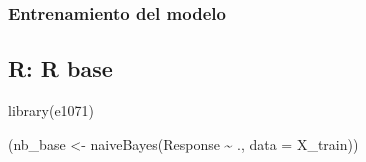 \documentclass[
  letterpaper,
  DIV=11,
  numbers=noendperiod]{scrartcl}
\newenvironment{Shaded}{\begin{snugshade}}{\end{snugshade}}
\newcommand{\AttributeTok}[1]{\textcolor[rgb]{0.40,0.45,0.13}{#1}}
\newcommand{\FunctionTok}[1]{\textcolor[rgb]{0.28,0.35,0.67}{#1}}
\newcommand{\NormalTok}[1]{\textcolor[rgb]{0.00,0.23,0.31}{#1}}
\newcommand{\OtherTok}[1]{\textcolor[rgb]{0.00,0.23,0.31}{#1}}
\newcommand{\SpecialCharTok}[1]{\textcolor[rgb]{0.37,0.37,0.37}{#1}}
\begin{document}
\subsubsection{Entrenamiento del
modelo}\label{entrenamiento-del-modelo-2}

\subsection{R: R base}

\begin{Shaded}
\begin{Highlighting}[]
\FunctionTok{library}\NormalTok{(e1071)}

\NormalTok{(nb\_base }\OtherTok{\textless{}{-}} \FunctionTok{naiveBayes}\NormalTok{(Response }\SpecialCharTok{\textasciitilde{}}\NormalTok{ ., }\AttributeTok{data =}\NormalTok{ X\_train))}
\end{Highlighting}
\end{Shaded}
\end{document}
